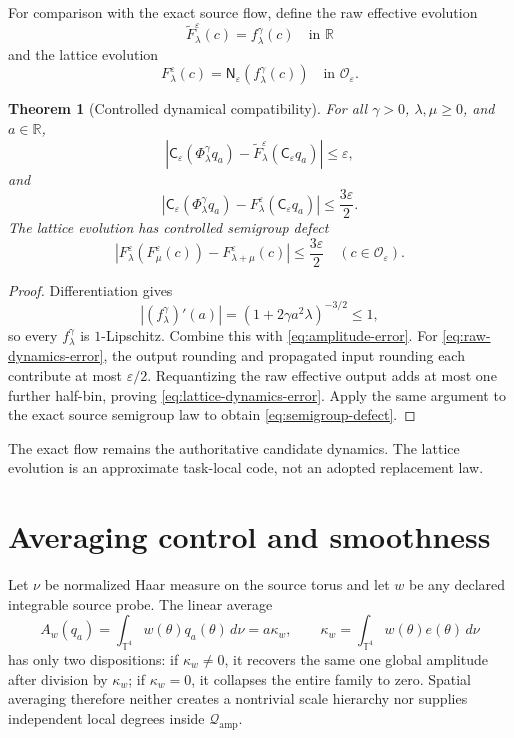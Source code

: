 \documentclass[11pt]{article}
\newcommand{\Qamp}{\mathcal Q_{\mathrm{amp}}}
\newcommand{\Oeps}{\mathcal O_\varepsilon}
\newcommand{\Ceps}{\mathsf C_\varepsilon}
\newcommand{\Neps}{\mathsf N_\varepsilon}
\newtheorem{theorem}{Theorem}
\begin{document}
For comparison with the exact source flow, define the raw effective evolution
\[
 \widetilde F^\varepsilon_\lambda(c)=f^\gamma_\lambda(c)
 \quad\text{in }\mathbb R
\]
and the lattice evolution
\[
 F^\varepsilon_\lambda(c)
 =\Neps(f^\gamma_\lambda(c))
 \quad\text{in }\Oeps.
\]

\begin{theorem}[Controlled dynamical compatibility]
\label{thm:dynamics}
For all \(\gamma>0\), \(\lambda,\mu\geq0\), and \(a\in\mathbb R\),
\[
 \left|
 \Ceps(\Phi^\gamma_\lambda q_a)
 -\widetilde F^\varepsilon_\lambda(\Ceps q_a)
 \right|\leq\varepsilon,
 \label{eq:raw-dynamics-error}
\]
and
\[
 \left|
 \Ceps(\Phi^\gamma_\lambda q_a)
 -F^\varepsilon_\lambda(\Ceps q_a)
 \right|\leq\frac{3\varepsilon}{2}.
 \label{eq:lattice-dynamics-error}
\]
The lattice evolution has controlled semigroup defect
\[
 \left|
 F^\varepsilon_\lambda(F^\varepsilon_\mu(c))
 -F^\varepsilon_{\lambda+\mu}(c)
 \right|\leq\frac{3\varepsilon}{2}
 \quad(c\in\Oeps).
 \label{eq:semigroup-defect}
\]
\end{theorem}

\begin{proof}
Differentiation gives
\[
 \left|(f^\gamma_\lambda)'(a)\right|
 =(1+2\gamma a^2\lambda)^{-3/2}\leq1,
\]
so every \(f^\gamma_\lambda\) is \(1\)-Lipschitz.  Combine this with
\eqref{eq:amplitude-error}.  For \eqref{eq:raw-dynamics-error}, the output
rounding and propagated input rounding each contribute at most
\(\varepsilon/2\).  Requantizing the raw effective output adds at most one
further half-bin, proving \eqref{eq:lattice-dynamics-error}.  Apply the same
argument to the exact source semigroup law to obtain
\eqref{eq:semigroup-defect}.
\end{proof}

The exact flow remains the authoritative candidate dynamics.  The lattice
evolution is an approximate task-local code, not an adopted replacement law.

\section{Averaging control and smoothness}

Let \(\nu\) be normalized Haar measure on the source torus and let \(w\) be
any declared integrable source probe.  The linear average
\[
 A_w(q_a)=\int_{\mathbb T^4}w(\theta)q_a(\theta)\,d\nu
 =a\kappa_w,\qquad
 \kappa_w=\int_{\mathbb T^4}w(\theta)e(\theta)\,d\nu
\]
has only two dispositions: if \(\kappa_w\neq0\), it recovers the same one
global amplitude after division by \(\kappa_w\); if \(\kappa_w=0\), it
collapses the entire family to zero.  Spatial averaging therefore neither
creates a nontrivial scale hierarchy nor supplies independent local degrees
inside \(\Qamp\).
\end{document}
